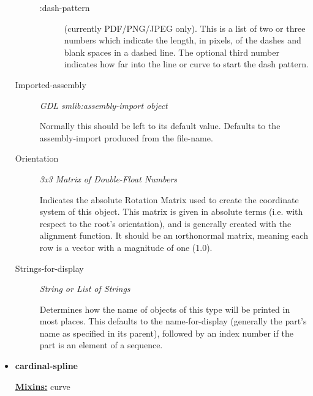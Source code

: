 \documentclass [11pt]{book}
\begin{document}
\begin{itemize}
\begin{description}
\begin{description}
\item[:dash-pattern]
(currently PDF/PNG/JPEG only). This is a list of two or three numbers which indicate the length,
in pixels, of the dashes and blank spaces in a dashed line. The optional third number
indicates how far into the line or curve to start the dash pattern.

\end{description}





\item [Imported-assembly]
\emph{GDL smlib:assembly-import object}

 Normally this should be left to its default value.
Defaults to the assembly-import produced from the file-name.




\item [Orientation]
\emph{3x3 Matrix of Double-Float Numbers}

 Indicates the absolute Rotation Matrix used to create
the coordinate system of this object. This matrix is given in absolute terms (i.e. with
respect to the root's orientation), and is generally created with the alignment function.
It should be an 
\i{orthonormal} matrix, meaning each row is a vector with a magnitude
of one (1.0).




\item [Strings-for-display]
\emph{String or List of Strings}

 Determines how the name of objects of this type will be printed in most places.
This defaults to the name-for-display (generally the part's name as specified in its
parent), followed by an index number if the part is an element of a sequence.




\end{description}







\item {}
\label{prim:cardinal-spline}
\textbf{cardinal-spline}


\textbf{
\underline{Mixins:}} curve





\begin{description}


\end{description}
\end{itemize}
\end{document}
